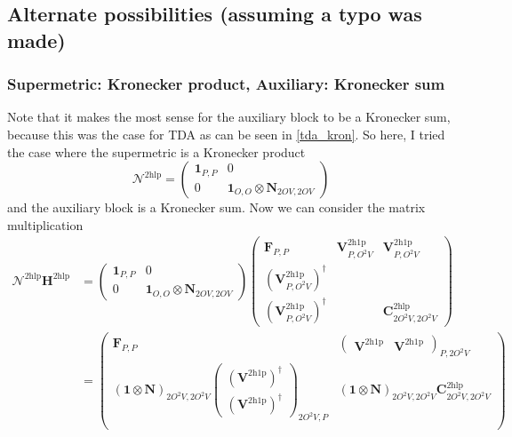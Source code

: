 \subsection{Alternate possibilities (assuming a typo was made)}
\subsubsection{Supermetric: Kronecker product, Auxiliary: Kronecker sum}
Note that it makes the most sense for the auxiliary block to be a Kronecker sum, because this was the case for TDA as can be seen in \ref{tda_kron}. So here, I tried the case where the supermetric is a Kronecker product
\begin{equation}
    \bm{\mathcal{N}}^{2 \mathrm{hlp}} = \begin{pmatrix}
        \bm{1}_{P,P} & 0 \\
        0 & \bm{1}_{O,O} \otimes \bm{N}_{2OV,2OV}
    \end{pmatrix}
\end{equation}
and the auxiliary block is a Kronecker sum.
Now we can consider the matrix multiplication
\begin{align}
    \bm{\mathcal{N}}^{2 \mathrm{hlp}} \bm{H}^{2 \mathrm{hlp}} &= \begin{pmatrix}
        \bm{1}_{P,P} & 0 \\
        0 & \bm{1}_{O,O} \otimes \bm{N}_{2OV,2OV}
    \end{pmatrix}
    \begin{pmatrix}
        \bm{F}_{P,P} & \bm{V}^{2\mathrm{h1p}}_{P,O^2V} & \bm{V}^{2\mathrm{h1p}}_{P,O^2V} \\
        \left(\bm{V}^{2\mathrm{h1p}}_{P,O^2V}\right)^{\dagger} &  &  \\
        \left(\bm{V}^{2\mathrm{h1p}}_{P,O^2V}\right)^{\dagger} &  & \bm{C}^{2\mathrm{hlp}}_{2O^2V,2O^2V}
    \end{pmatrix} \\
&= \begin{pmatrix}
        \bm{F}_{P,P} & \begin{pmatrix} \bm{V}^{2\mathrm{h1p}} & \bm{V}^{2\mathrm{h1p}}\end{pmatrix}_{P,2O^2V} \\
        \left( \bm{1} \otimes \bm{N} \right)_{2O^2V,2O^2V}\begin{pmatrix} \left(\bm{V}^{2\mathrm{h1p}}\right)^{\dagger} \\ \left( \bm{V}^{2\mathrm{h1p}}\right)^{\dagger} \end{pmatrix}_{2O^2V,P} &   \left( \bm{1} \otimes \bm{N} \right)_{2O^2V,2O^2V} \bm{C}^{2\mathrm{hlp}}_{2O^2V,2O^2V}  \\
    \end{pmatrix} \\
\end{align}
